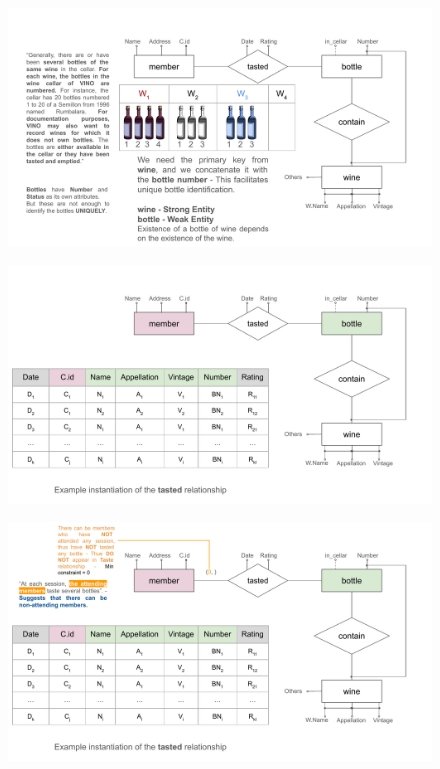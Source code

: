 \documentclass{beamer}
\begin{document}
\begin{frame}
    \begin{figure}
        \centering
        \includegraphics[width=1.1\linewidth]{tut_02_files/09.pdf}
    \end{figure}
\end{frame}

\begin{frame}
    \begin{figure}
        \centering
        \includegraphics[width=1.1\linewidth]{tut_02_files/10.pdf}
    \end{figure}
\end{frame}

\begin{frame}
    \begin{figure}
        \centering
        \includegraphics[width=1.1\linewidth]{tut_02_files/11.pdf}
    \end{figure}
\end{frame}
\end{document}
